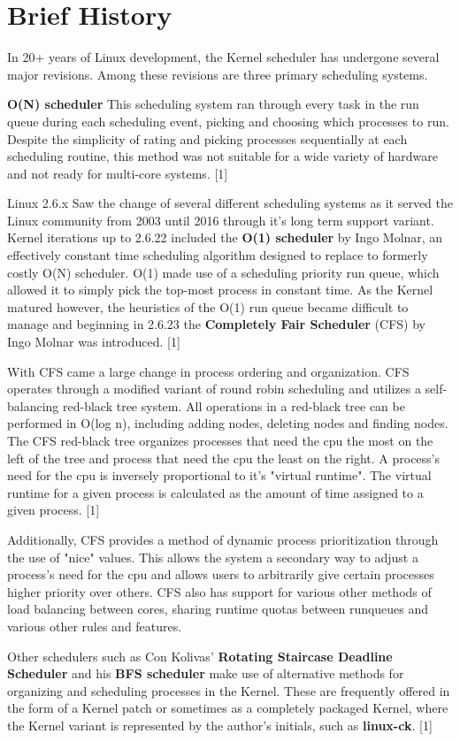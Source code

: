 \section{Brief History}

In 20+ years of Linux development, the Kernel scheduler has undergone several major revisions. Among these revisions are three primary scheduling systems.

\textbf{O(N) scheduler} This scheduling system ran through every task in the run queue during each scheduling event, picking and choosing which processes to run. Despite the simplicity of rating and picking processes sequentially at each scheduling routine, this method was not suitable for a wide variety of hardware and not ready for multi-core systems. [1]

Linux 2.6.x Saw the change of several different scheduling systems as it served the Linux community from 2003 until 2016 through it's long term support variant. Kernel iterations up to 2.6.22 included the \textbf{O(1) scheduler} by Ingo Molnar, an effectively constant time scheduling algorithm designed to replace to formerly costly O(N) scheduler. O(1) made use of a scheduling priority run queue, which allowed it to simply pick the top-most process in constant time. As the Kernel matured however, the heuristics of the O(1) run queue became difficult to manage and beginning in 2.6.23 the \textbf{Completely Fair Scheduler} (CFS) by Ingo Molnar was introduced. [1]

With CFS came a large change in process ordering and organization. CFS operates through a modified variant of round robin scheduling and utilizes a self-balancing red-black tree system. All operations in a red-black tree can be performed in O(log n), including adding nodes, deleting nodes and finding nodes. The CFS red-black tree organizes processes that need the cpu the most on the left of the tree and process that need the cpu the least on the right. A process's need for the cpu is inversely proportional to it's "virtual runtime". The virtual runtime for a given process is calculated as the amount of time assigned to a given process. [1]

Additionally, CFS provides a method of dynamic process prioritization through the use of "nice" values. This allows the system a secondary way to adjust a process's need for the cpu and allows users to arbitrarily give certain processes higher priority over others. CFS also has support for various other methods of load balancing between cores, sharing runtime quotas between runqueues and various other rules and features.

Other schedulers such as Con Kolivas' \textbf{Rotating Staircase Deadline Scheduler} and his \textbf{BFS scheduler} make use of alternative methods for organizing and scheduling processes in the Kernel. These are frequently offered in the form of a Kernel patch or sometimes as a completely packaged Kernel, where the Kernel variant is represented by the author's initials, such as \textbf{linux-ck}. [1]